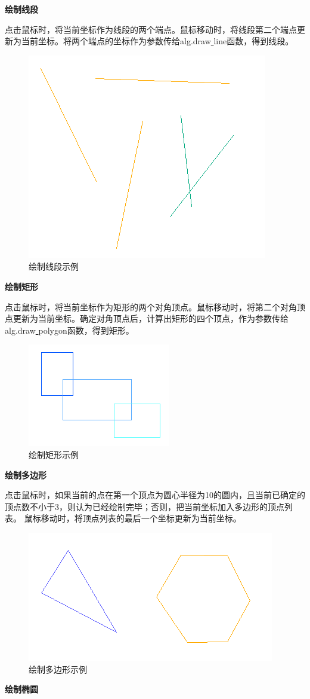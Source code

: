 \documentclass[a4paper,UTF8]{article}
\begin{document}
\newpage
\textbf{绘制线段}

点击鼠标时，将当前坐标作为线段的两个端点。鼠标移动时，将线段第二个端点更新为当前坐标。将两个端点的坐标作为参数传给alg.draw\underline{ }line函数，得到线段。
\begin{figure}[H]
	\centering
	\includegraphics[scale=0.8]{draw-line.PNG}
	\caption{绘制线段示例}
\end{figure}


\textbf{绘制矩形}

点击鼠标时，将当前坐标作为矩形的两个对角顶点。鼠标移动时，将第二个对角顶点更新为当前坐标。确定对角顶点后，计算出矩形的四个顶点，作为参数传给alg.draw\underline{ }polygon函数，得到矩形。
\begin{figure}[H]
	\centering
	\includegraphics[scale=0.8]{draw-rectangle.PNG}
	\caption{绘制矩形示例}
\end{figure}


\textbf{绘制多边形}

点击鼠标时，如果当前的点在第一个顶点为圆心半径为10的圆内，且当前已确定的顶点数不小于3，则认为已经绘制完毕；否则，把当前坐标加入多边形的顶点列表。
鼠标移动时，将顶点列表的最后一个坐标更新为当前坐标。
\begin{figure}[H]
    \centering
    \includegraphics[scale=0.8]{draw-polygen.PNG}
    \caption{绘制多边形示例}
\end{figure}
\newpage
\textbf{绘制椭圆}
\end{document}
